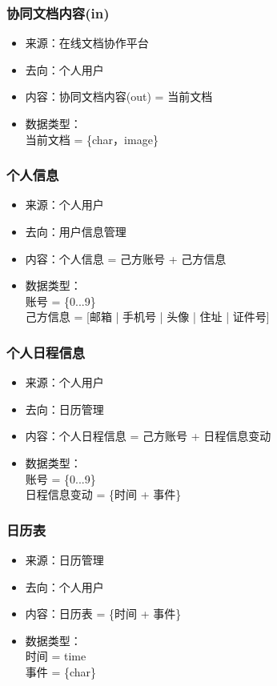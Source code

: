             \subsubsection{协同文档内容(in)}
            \begin{itemize}
                \item 来源：在线文档协作平台
                \item 去向：个人用户
                \item 内容：协同文档内容(out) = 当前文档
                \item 数据类型：\\
                当前文档 = \{char，image\}\\
            \end{itemize}
            \subsubsection{个人信息}
            \begin{itemize}
                \item 来源：个人用户
                \item 去向：用户信息管理
                \item 内容：个人信息 = 己方账号 + 己方信息
                \item 数据类型：\\
                账号 = \{0...9\}\\
                己方信息 = [邮箱 | 手机号 | 头像 | 住址 | 证件号]\\
            \end{itemize}
            \subsubsection{个人日程信息}
            \begin{itemize}
                \item 来源：个人用户
                \item 去向：日历管理
                \item 内容：个人日程信息 = 己方账号 + 日程信息变动
                \item 数据类型：\\
                账号 = \{0...9\}\\
                日程信息变动 = \{时间 + 事件\}\\
            \end{itemize}
            \subsubsection{日历表}
            \begin{itemize}
                \item 来源：日历管理
                \item 去向：个人用户
                \item 内容：日历表 = \{时间 + 事件\}
                \item 数据类型：\\
                时间 = time\\
                事件 = \{char\}\\
            \end{itemize}
